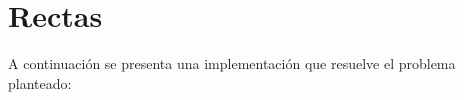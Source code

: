 \section{Rectas}

A continuación se presenta una implementación que resuelve el problema planteado:

